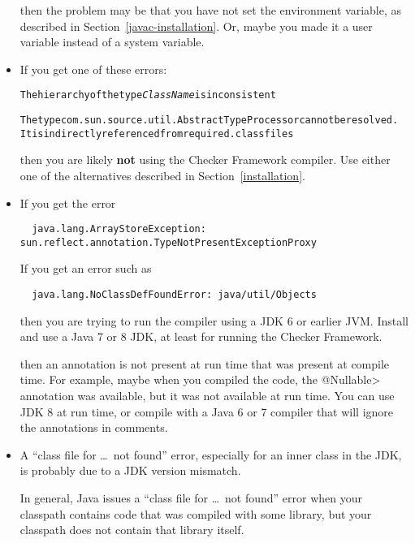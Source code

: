 \begin{itemize}
\noindent
then the problem may be that you have not set the  environment
variable, as described in Section~\ref{javac-installation}.  Or, maybe
you made it a user variable instead of a system variable.

\item
If you get one of these errors:

\begin{alltt}
The hierarchy of the type \emph{ClassName} is inconsistent

The type com.sun.source.util.AbstractTypeProcessor cannot be resolved.
  It is indirectly referenced from required .class files
\end{alltt}

\noindent
then you are likely \textbf{not} using the Checker Framework compiler.  Use
either  one of the alternatives
described in Section~\ref{installation}.


\item
If you get the error

\begin{Verbatim}
  java.lang.ArrayStoreException: sun.reflect.annotation.TypeNotPresentExceptionProxy
\end{Verbatim}

\noindent
If you get an error such as

\begin{Verbatim}
  java.lang.NoClassDefFoundError: java/util/Objects
\end{Verbatim}

\noindent
then you are trying to run the compiler using a JDK 6 or earlier JVM\@.
Install and use a Java 7 or 8 JDK, at least for running the Checker
Framework.

\noindent
then an annotation is not present at run time that was present at compile
time.  For example, maybe when you compiled the code, the \<@Nullable>
annotation was available, but it was not available at run time.
You can use JDK 8 at run time, or compile
with a Java 6 or 7 compiler that will ignore the annotations in comments.

\item
A ``class file for \ldots\ not found'' error, especially for an inner class
in the JDK, is probably due to a JDK version mismatch.

In general, Java issues a ``class file for \ldots\ not found'' error when
your classpath contains code that was compiled
with some library, but your classpath does not contain that library itself.


\end{itemize}
